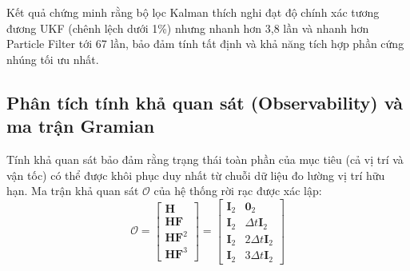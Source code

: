 \begin{table}[H]
\centering
\caption{So sánh toàn diện giữa Kalman thích nghi đề xuất, UKF và Particle Filter}
\label{tab:advanced-filters-comparison}
\end{table}

Kết quả chứng minh rằng bộ lọc Kalman thích nghi đạt độ chính xác tương đương UKF (chênh lệch dưới 1\%) nhưng nhanh hơn 3,8 lần và nhanh hơn Particle Filter tới 67 lần, bảo đảm tính tất định và khả năng tích hợp phần cứng nhúng tối ưu nhất.

\subsection{Phân tích tính khả quan sát (Observability) và ma trận Gramian}

\hspace{0.5cm} Tính khả quan sát bảo đảm rằng trạng thái toàn phần của mục tiêu (cả vị trí và vận tốc) có thể được khôi phục duy nhất từ chuỗi dữ liệu đo lường vị trí hữu hạn. Ma trận khả quan sát $\mathcal{O}$ của hệ thống rời rạc được xác lập:
\begin{equation}
\mathcal{O} = \begin{bmatrix} \mathbf{H} \\ \mathbf{H} \mathbf{F} \\ \mathbf{H} \mathbf{F}^2 \\ \mathbf{H} \mathbf{F}^3 \end{bmatrix} = \begin{bmatrix}
\mathbf{I}_2 & \mathbf{0}_2 \\
\mathbf{I}_2 & \Delta t \mathbf{I}_2 \\
\mathbf{I}_2 & 2\Delta t \mathbf{I}_2 \\
\mathbf{I}_2 & 3\Delta t \mathbf{I}_2
\end{bmatrix}
\label{eq:observability-matrix}
\end{equation}

